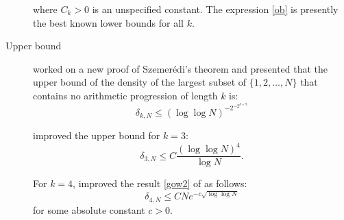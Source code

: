 \begin{description}
where $C_k >0$ is an unspecified constant. The expression \eqref{ob} is presently the best known  lower bounds for all $k.$

\item[Upper bound]
\cite{gowers2001new} worked on a new proof of Szemerédi's theorem and presented  that the upper bound of the density of the largest subset of $\{1,2, \ldots, N\}$ that contains no arithmetic progression of length $k$ is:
\begin{equation}
\delta_{k,N} \leq  \left(\log \log N\right)^{-2^{-2^{k+9}}} \label{gow2}
\end{equation}


\cite{bloom2016quantitative} improved the upper bound for $k=3:$
\begin{equation}
\delta_{3,N} \leq C \frac{(\log \log N)^4}{\log N} . \label{r32}
\end{equation}

For $k=4$, \cite{green2006new} improved the result \eqref{gow2} of \cite{gowers2001new} as follows:
\begin{equation}
\delta_{4,N} \leq C N e^{-c\sqrt{\log \log N}} \label{r4}
\end{equation}
for some absolute constant $c > 0.$
\end{description}



